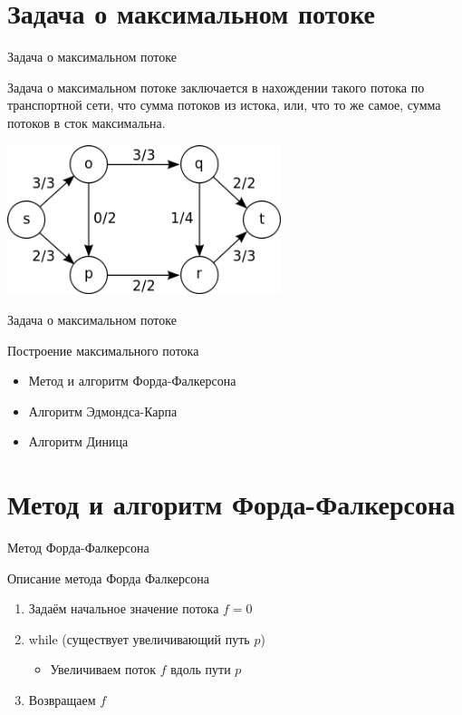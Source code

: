 \documentclass[10pt]{beamer}
\begin{document}
\section{Задача о максимальном потоке}

\begin{frame}[fragile]{Задача о максимальном потоке}

Задача о максимальном потоке заключается в нахождении такого потока по транспортной сети, что сумма потоков из истока, или, что то же самое, сумма потоков в сток максимальна.

\begin{center}
    \includegraphics[width=8cm]{Term_2/Source/images/8-flow-rich-networkr.png}
\end{center}


\end{frame}

\begin{frame}[fragile]{Задача о максимальном потоке}

Построение максимального потока
\begin{itemize}
    \item Метод и алгоритм Форда-Фалкерсона
    \item Алгоритм Эдмондса-Карпа
    \item Алгоритм Диница
\end{itemize}

\end{frame}

\section{Метод и алгоритм Форда-Фалкерсона}

\begin{frame}[fragile]{Метод Форда-Фалкерсона}

Описание метода Форда Фалкерсона
\begin{enumerate}
    \item Задаём начальное значение потока $f=0$
    \item while (существует увеличивающий путь $p$)
        \begin{itemize}
            \item Увеличиваем поток $f$ вдоль пути $p$
        \end{itemize}
    \item Возвращаем $f$
\end{enumerate}

\end{frame}
\end{document}
